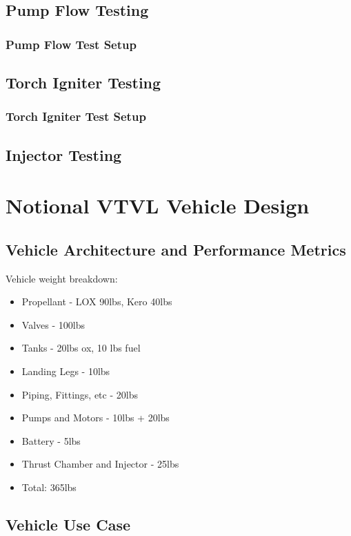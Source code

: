 \documentclass[12pt, letterpaper]{article}
\begin{document}
\subsection{Pump Flow Testing}
\subsubsection{Pump Flow Test Setup}
\subsection{Torch Igniter Testing}
\subsubsection{Torch Igniter Test Setup}
\subsection{Injector Testing}

\newpage

\section{Notional VTVL Vehicle Design}
\subsection{Vehicle Architecture and Performance Metrics}

Vehicle weight breakdown:\par
\begin{itemize}
    \item Propellant - LOX 90lbs, Kero 40lbs
    \item Valves - 100lbs
    \item Tanks - 20lbs ox, 10 lbs fuel
    \item Landing Legs - 10lbs
    \item Piping, Fittings, etc - 20lbs
    \item Pumps and Motors - 10lbs + 20lbs
    \item Battery - 5lbs
    \item Thrust Chamber and Injector - 25lbs
    \item Total: 365lbs
\end{itemize}

\subsection{Vehicle Use Case}
\end{document}
